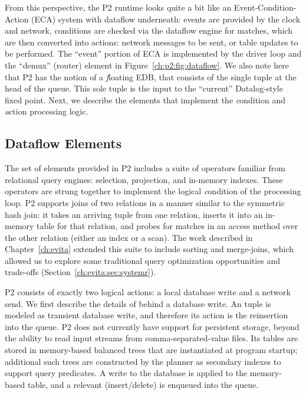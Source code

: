 From this perspective, the P2 runtime looks quite a bit like an
Event-Condition-Action (ECA) system with dataflow underneath: events are
provided by the clock and network, conditions are checked via the dataflow
engine for matches, which are then converted into actions: network messages to
be sent, or table updates to be performed.  The ``event'' portion of ECA is
implemented by the driver loop and the ``demux'' (router) element in
Figure~\ref{ch:p2:fig:dataflow}.  We also note here that P2 has the notion of a
{\emph floating} EDB, that consists of the single tuple at the head of the 
queue.  This sole tuple is the input to the ``current'' Datalog-style fixed point.
Next, we describe the elements that implement the {\emph condition} and {\emph
action} processing logic.

\subsection{Dataflow Elements} 
\label{ch:p2:sec:dataflow_elements}

The set of elements provided in P2 includes a suite of operators familiar from
relational query engines: selection, projection, and in-memory indexes.  These
operators are strung together to implement the logical {\emph condition} of the 
processing loop.  P2 supports joins of two relations in a manner similar to the
symmetric hash join: it takes an arriving tuple from one relation, inserts it
into an in-memory table for that relation, and probes for matches in an access
method over the other relation (either an index or a scan).  The work described
in Chapter~\ref{ch:evita} extended this suite to include sorting and
merge-joins, which allowed us to explore some traditional query optimization
opportunities and trade-offs (Section~\ref{ch:evita:sec:systemr}).

P2 consists of exactly two logical {\emph actions}: a local database write and
a network send.  We first describe the details of behind a database write.  An
 tuple is modeled as transient database write, and therefore its
action is the reinsertion into the  queue.  P2 does not currently
have support for persistent storage, beyond the ability to read input streams
from comma-separated-value files.  Its tables are stored in memory-based
balanced trees that are instantiated at program startup; additional such trees
are constructed by the planner as secondary indexes to support query
predicates.  A write to the database is applied to the memory-based table, and
a relevant (insert/delete)  is enqueued into the  queue.

